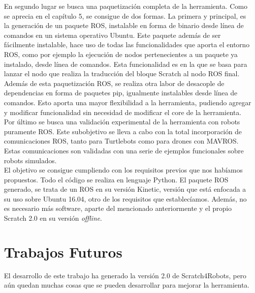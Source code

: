 En segundo lugar se busca una paquetización completa de la herramienta. Como se aprecia en el capítulo 5, se consigue de dos formas. La primera y principal, es la generación de un paquete ROS, instalable en forma de binario desde línea de comandos en un sistema operativo Ubuntu. Este paquete además de ser fácilmente instalable, hace uso de todas las funcionalidades que aporta el entorno ROS, como por ejemplo la ejecución de nodos pertenecientes a un paquete ya instalado, desde línea de comandos. Esta funcionalidad es en la que se basa para lanzar el nodo que realiza la traducción del bloque Scratch al nodo ROS final. \\

Además de esta paquetización ROS, se realiza otra labor de desacople de dependencias en forma de paquetes pip, igualmente instalables desde línea de comandos. Esto aporta una mayor flexibilidad a la herramienta, pudiendo agregar y modificar funcionalidad sin necesidad de modificar el core de la herramienta.\\

Por último se busca una validación experimental de la herramienta con robots puramente ROS. Este subobjetivo se lleva a cabo con la total incorporación de comunicaciones ROS, tanto para Turtlebots como para drones con MAVROS. Estas comunicaciones son validadas con una serie de ejemplos funcionales sobre robots simulados.\\

El objetivo se consigue cumpliendo con los requisitos previos que nos habíamos propuestos. Todo el código se realiza en lenguaje Python. El paquete ROS generado, se trata de un ROS en su versión Kinetic, versión que está enfocada a su uso sobre Ubuntu 16.04, otro de los requisitos que establecíamos. Además, no es necesario  más software, aparte del mencionado anteriormente y el propio Scratch 2.0 en su versión \textit{offline}.


\section{Trabajos Futuros}
\label{sec:trabajos-futuros}

El desarrollo de este trabajo ha generado la versión 2.0 de Scratch4Robots, pero aún quedan muchas cosas que se pueden desarrollar para mejorar la herramienta.\\

